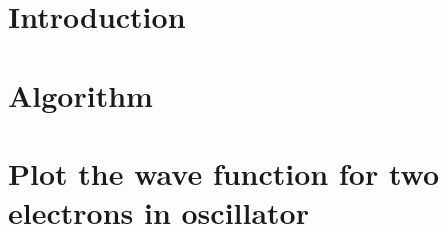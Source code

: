 \documentclass[a4paper,english]{article}
\begin{document}
\section{Introduction}


\section{Algorithm}


\section{Plot the wave function for two electrons in oscillator}

\end{document}
